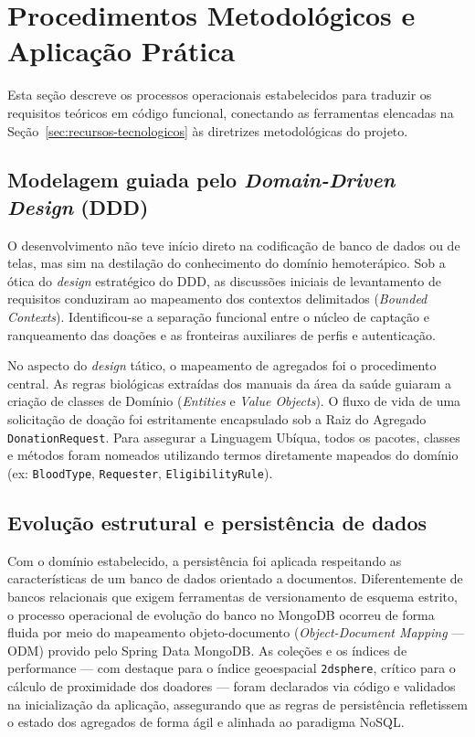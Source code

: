 \section{Procedimentos Metodológicos e Aplicação Prática}
\label{sec:procedimentos-praticos}

Esta seção descreve os processos operacionais estabelecidos para traduzir os requisitos teóricos em código funcional, conectando as ferramentas elencadas na Seção~\ref{sec:recursos-tecnologicos} às diretrizes metodológicas do projeto.

\subsection{Modelagem guiada pelo \textit{Domain-Driven Design} (DDD)}

O desenvolvimento não teve início direto na codificação de banco de dados ou de telas, mas sim na destilação do conhecimento do domínio hemoterápico. Sob a ótica do \textit{design} estratégico do DDD, as discussões iniciais de levantamento de requisitos conduziram ao mapeamento dos contextos delimitados (\textit{Bounded Contexts}). Identificou-se a separação funcional entre o núcleo de captação e ranqueamento das doações e as fronteiras auxiliares de perfis e autenticação.

No aspecto do \textit{design} tático, o mapeamento de agregados foi o procedimento central. As regras biológicas extraídas dos manuais da área da saúde guiaram a criação de classes de Domínio (\textit{Entities} e \textit{Value Objects}). O fluxo de vida de uma solicitação de doação foi estritamente encapsulado sob a Raiz do Agregado \texttt{DonationRequest}. Para assegurar a Linguagem Ubíqua, todos os pacotes, classes e métodos foram nomeados utilizando termos diretamente mapeados do domínio (ex: \texttt{BloodType}, \texttt{Requester}, \texttt{EligibilityRule}).

\subsection{Evolução estrutural e persistência de dados}

Com o domínio estabelecido, a persistência foi aplicada respeitando as características de um banco de dados orientado a documentos. Diferentemente de bancos relacionais que exigem ferramentas de versionamento de esquema estrito, o processo operacional de evolução do banco no MongoDB ocorreu de forma fluida por meio do mapeamento objeto-documento (\textit{Object-Document Mapping} --- ODM) provido pelo Spring Data MongoDB. As coleções e os índices de performance --- com destaque para o índice geoespacial \texttt{2dsphere}, crítico para o cálculo de proximidade dos doadores --- foram declarados via código e validados na inicialização da aplicação, assegurando que as regras de persistência refletissem o estado dos agregados de forma ágil e alinhada ao paradigma NoSQL.

